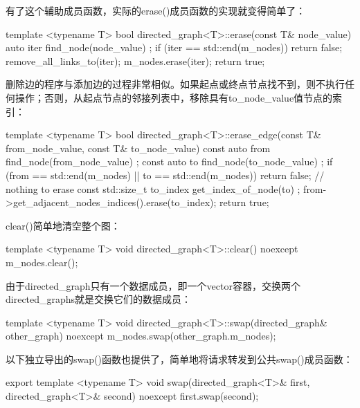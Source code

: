 有了这个辅助成员函数，实际的erase()成员函数的实现就变得简单了：

\begin{cpp}
template <typename T>
bool directed_graph<T>::erase(const T& node_value)
{
    auto iter { find_node(node_value) };
    if (iter == std::end(m_nodes)) { return false; }
    remove_all_links_to(iter);
    m_nodes.erase(iter);
    return true;
}
\end{cpp}


删除边的程序与添加边的过程非常相似。如果起点或终点节点找不到，则不执行任何操作；否则，从起点节点的邻接列表中，移除具有to\_node\_value值节点的索引：

\begin{cpp}
template <typename T>
bool directed_graph<T>::erase_edge(const T& from_node_value,
const T& to_node_value)
{
    const auto from { find_node(from_node_value) };
    const auto to { find_node(to_node_value) };
    if (from == std::end(m_nodes) || to == std::end(m_nodes)) {
        return false; // nothing to erase
    }
    const std::size_t to_index { get_index_of_node(to) };
    from->get_adjacent_nodes_indices().erase(to_index);
    return true;
}
\end{cpp}


clear()简单地清空整个图：

\begin{cpp}
template <typename T>
void directed_graph<T>::clear() noexcept
{
    m_nodes.clear();
}
\end{cpp}


由于directed\_graph只有一个数据成员，即一个vector容器，交换两个directed\_graphs就是交换它们的数据成员：

\begin{cpp}
template <typename T>
void directed_graph<T>::swap(directed_graph& other_graph) noexcept
{
    m_nodes.swap(other_graph.m_nodes);
}
\end{cpp}

以下独立导出的swap()函数也提供了，简单地将请求转发到公共swap()成员函数：

\begin{cpp}
export template <typename T>
void swap(directed_graph<T>& first, directed_graph<T>& second) noexcept
{
    first.swap(second);
}
\end{cpp}


